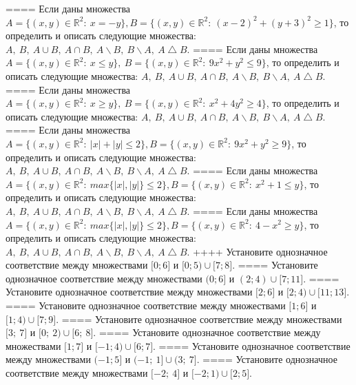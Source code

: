 ====
Если даны множества \(A = \{(x,y) \in \mathbb{R}^{2}:\ x = - y\},B = \{(x,y) \in \mathbb{R}^{2}:\ (x - 2)^{2} + (y + 3)^{2} \geq 1\}\), то определить и описать следующие множества: \(A,\ B,\ A \cup B,\ A \cap B,\ A \backslash B,\ B \backslash A,\ A \bigtriangleup B\).
====
Если даны множества \(A = \{(x,y) \in \mathbb{R}^{2}:\ x \leq y\},\ B = \{(x,y) \in \mathbb{R}^{2}:\ 9x^{2} + y^{2} \leq 9\}\), то определить и описать следующие множества: \(A,\ B,\ A \cup B,\ A \cap B,\ A \backslash B,\ B \backslash A,\ A \bigtriangleup B\).
====
Если даны множества \(A = \{(x,y) \in \mathbb{R}^{2}:\ x \geq y\},\ B = \{(x,y) \in \mathbb{R}^{2}:\ x^{2} + 4y^{2} \geq 4\}\), то определить и описать следующие множества: \(A,\ B,\ A \cup B,\ A \cap B,\ A \backslash B,\ B \backslash A,\ A \bigtriangleup B\).
====
Если даны множества \(A = \{(x,y) \in \mathbb{R}^{2}:\ |x| + |y| \leq 2\},B = \{(x,y) \in \mathbb{R}^{2}:\ 9x^{2} + y^{2} \geq 9\}\), то определить и описать следующие множества: \(A,\ B,\ A \cup B,\ A \cap B,\ A \backslash B,\ B \backslash A,\ A \bigtriangleup B\).
====
Если даны множества \(A = \{(x,y) \in \mathbb{R}^{2}:\ max\{|x|,|y|\} \leq 2\},B = \{(x,y) \in \mathbb{R}^{2}:\ x^{2} + 1 \leq y\}\), то определить и описать следующие множества: \(A,\ B,\ A \cup B,\ A \cap B,\ A \backslash B,\ B \backslash A,\ A \bigtriangleup B\).
====
Если даны множества \(A = \{(x,y) \in \mathbb{R}^{2}:\ max\{|x|,|y|\} \leq 2\},B = \{(x,y) \in \mathbb{R}^{2}:\ 4 - x^{2} \geq y\}\), то определить и описать следующие множества: \(A,\ B,\ A \cup B,\ A \cap B,\ A \backslash B,\ B \backslash A,\ A \bigtriangleup B\).
++++
Установите однозначное соответствие между множествами \(\lbrack 0;6\rbrack\) и \(\lbrack 0;5) \cup \lbrack 7;8\rbrack\).
====
Установите однозначное соответствие между множествами \((0;6\rbrack\) и \((2;4) \cup \lbrack 7;11\rbrack\).
====
Установите однозначное соответствие между множествами \(\lbrack 2;6\rbrack\) и \(\lbrack 2;4) \cup \lbrack 11;13\rbrack\).
====
Установите однозначное соответствие между множествами \(\lbrack 1;6\rbrack\) и \(\lbrack 1;4) \cup \lbrack 7;9\rbrack\).
====
Установите однозначное соответствие между множествами \(\lbrack 3;\ 7\rbrack\) и \(\lbrack 0;\ 2) \cup \lbrack 6;\ 8\rbrack\).
====
Установите однозначное соответствие между множествами \(\lbrack 1;7\rbrack\) и \(\lbrack - 1;4) \cup \lbrack 6;7\rbrack\).
====
Установите однозначное соответствие между множествами \(( - 1;5\rbrack\) и \(( - 1;\ 1\rbrack \cup (3;\ 7\rbrack\).
====
Установите однозначное соответствие между множествами \(\lbrack - 2;\ 4\rbrack\) и \(\lbrack - 2;1) \cup \lbrack 2;5\rbrack\).
